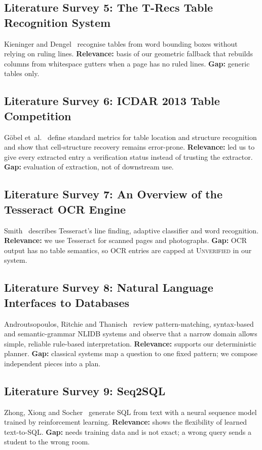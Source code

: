 \subsection{Literature Survey 5: The T-Recs Table Recognition System}
Kieninger and Dengel~\cite{kieninger1998} recognise tables from word bounding boxes without relying on
ruling lines. \textbf{Relevance:} basis of our geometric fallback that rebuilds columns from whitespace
gutters when a page has no ruled lines. \textbf{Gap:} generic tables only.

\subsection{Literature Survey 6: ICDAR 2013 Table Competition}
G\"obel et~al.~\cite{gobel2013} define standard metrics for table location and structure recognition
and show that cell-structure recovery remains error-prone. \textbf{Relevance:} led us to give every
extracted entry a verification status instead of trusting the extractor. \textbf{Gap:} evaluation of
extraction, not of downstream use.

\subsection{Literature Survey 7: An Overview of the Tesseract OCR Engine}
Smith~\cite{smith2007} describes Tesseract's line finding, adaptive classifier and word recognition.
\textbf{Relevance:} we use Tesseract for scanned pages and photographs. \textbf{Gap:} OCR output has
no table semantics, so OCR entries are capped at \textsc{Unverified} in our system.

\subsection{Literature Survey 8: Natural Language Interfaces to Databases}
Androutsopoulos, Ritchie and Thanisch~\cite{androutsopoulos1995} review pattern-matching, syntax-based
and semantic-grammar NLIDB systems and observe that a narrow domain allows simple, reliable
rule-based interpretation. \textbf{Relevance:} supports our deterministic planner. \textbf{Gap:}
classical systems map a question to one fixed pattern; we compose independent pieces into a plan.

\subsection{Literature Survey 9: Seq2SQL}
Zhong, Xiong and Socher~\cite{zhong2017} generate SQL from text with a neural sequence model trained
by reinforcement learning. \textbf{Relevance:} shows the flexibility of learned text-to-SQL.
\textbf{Gap:} needs training data and is not exact; a wrong query sends a student to the wrong room.

